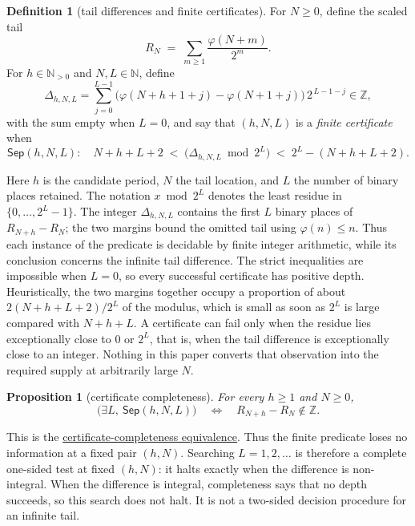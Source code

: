 \documentclass[11pt]{article}
\newcommand{\commit}{312b96c0d149ed466725c62d4ef24cfc91bca34e}
\newcommand{\repobase}{https://github.com/wcook04/plectis-lean-erdos249-257/blob/\commit}
\newcommand{\PK}{Erdos249257}
\newcommand{\lword}[4]{\href{\repobase/\PK/#1\#L#2}{#4}}
\newtheorem{proposition}[theorem]{Proposition}
\theoremstyle{definition}
\newtheorem{definition}[theorem]{Definition}
\theoremstyle{remark}
\newcommand{\N}{\mathbb{N}}
\newcommand{\Npos}{\mathbb{N}_{>0}}
\newcommand{\Z}{\mathbb{Z}}
\newcommand{\ph}{\varphi}
\begin{document}
\begin{definition}[tail differences and finite certificates]
\label{def:totient-certificate}
For $N\ge0$, define the scaled tail
\[
R_N \;=\; \sum_{m\ge1}\frac{\ph(N+m)}{2^m}.
\]
For $h\in\Npos$ and $N,L\in\N$, define
\[
\Delta_{h,N,L}=\sum_{j=0}^{L-1}\big(\ph(N+h+1+j)-\ph(N+1+j)\big)\,2^{\,L-1-j}\in\Z,
\]
with the sum empty when \(L=0\),
and say that $(h,N,L)$ is a \emph{finite certificate} when
\[
\mathsf{Sep}(h,N,L):\quad
N+h+L+2 \;<\; \big(\Delta_{h,N,L}\bmod 2^L\big) \;<\; 2^L-(N+h+L+2).
\]
\end{definition}

Here $h$ is the candidate period, $N$ the tail location, and $L$ the number
of binary places retained.
The notation \(x\bmod 2^L\) denotes the least residue in
\(\{0,\ldots,2^L-1\}\).  The integer $\Delta_{h,N,L}$ contains the first
$L$ binary places of $R_{N+h}-R_N$; the two margins bound the omitted tail
using $\ph(n)\le n$.  Thus each instance of the predicate is decidable by
finite integer arithmetic, while its conclusion concerns the infinite tail
difference.  The strict inequalities are impossible when \(L=0\), so every
successful certificate has positive depth.
Heuristically, the two margins together occupy a proportion of about
\(2(N{+}h{+}L{+}2)/2^L\) of the modulus, which is small as soon as
\(2^L\) is large compared with \(N+h+L\).  A certificate can fail only
when the residue lies exceptionally close to \(0\) or \(2^L\), that is,
when the tail difference is exceptionally close to an integer.  Nothing
in this paper converts that observation into the required supply at
arbitrarily large \(N\).

\begin{proposition}[certificate completeness]\label{res:complete}
For every $h\ge1$ and $N\ge0$,
\[
\bigl(\exists L,\ \mathsf{Sep}(h,N,L)\bigr)
\quad\Longleftrightarrow\quad
R_{N+h}-R_N\notin\Z.
\]
\end{proposition}
\noindent This is the
\lword{LcmConeFlatness.lean}{316}{exists_certifiedKill_iff_tail_diff_notMem_int}{certificate-completeness equivalence}.
Thus the finite predicate loses no information at a fixed pair \((h,N)\).
Searching \(L=1,2,\ldots\) is therefore a complete one-sided test at fixed
\((h,N)\): it halts
exactly when the difference is non-integral.  When the difference is integral,
completeness says that no depth succeeds, so this search does not halt.  It is
not a two-sided decision procedure for an infinite tail.
\end{document}
